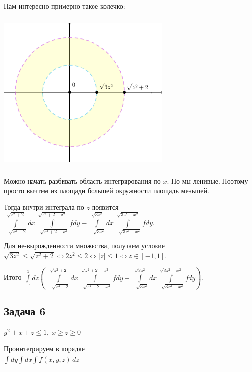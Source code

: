 \documentclass[a4paper, fleqn]{article}
\begin{document}
    Нам интересно примерно такое колечко:
    
    
   \includegraphics[width=8.5cm, height=8cm]{list24imgs/task 2.4.3.png}
    
    Можно начать разбивать область интегрирования по $x$. Но мы ленивые. Поэтому просто вычтем из площади большей окружности площадь меньшей.
    
    Тогда внутри интеграла по $z$ появится $\displaystyle \int \limits_{-\sqrt{z^2 + 2}}^{\sqrt{z^2 + 2}} dx \int \limits_{-\sqrt{z^2 + 2 - x^2}}^{\sqrt{z^2 + 2 - x^2}} f dy - \int \limits_{-\sqrt{3z^2}}^{\sqrt{3z^2}} dx \int \limits_{-\sqrt{3z^2- x^2}}^{\sqrt{3z^2 - x^2}} f dy  .$
    
    
    Для не-вырожденности множества, получаем условие $\sqrt{3z^2} \leq \sqrt{z^2 + 2} \iff 2z^2 \leq 2 \iff |z| \leq 1 \iff z \in [-1, 1].$
    
    
    Итого $\displaystyle \int \limits_{-1}^{1} dz \left( \; \int \limits_{-\sqrt{z^2 + 2}}^{\sqrt{z^2 + 2}} dx \int \limits_{-\sqrt{z^2 + 2 - x^2}}^{\sqrt{z^2 + 2 - x^2}} f dy - \int \limits_{-\sqrt{3z^2}}^{\sqrt{3z^2}} dx \int \limits_{-\sqrt{3z^2- x^2}}^{\sqrt{3z^2 - x^2}} f dy  \right).$
    
    \subsection*{Задача 6}
    
    $y^2 + x + z \le 1, \; x \ge z \ge 0$
    
    Проинтегрируем в порядке \\[3 pt]
    $\int\limits_{\dots}^{\dots} dy \int\limits_{\dots}^{\dots} dx \int\limits_{\dots}^{\dots} f(x, y, z)\, dz$ \\
    
\end{document}
